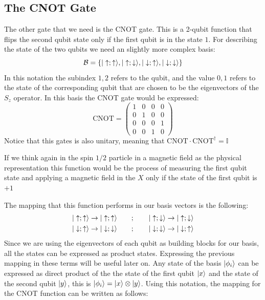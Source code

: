 \subsection{The CNOT Gate}
The other gate that we need is the CNOT gate. This is a 2-qubit function that flips the second qubit state only if the first qubit is in the state $1$. For describing the state of the two qubits we need an slightly more complex basis:
\begin{equation}
  \mathcal{B}=
  \left\{|\uparrow;\uparrow\rangle,|\uparrow;\downarrow\rangle,|\downarrow;\uparrow\rangle,|\downarrow;\downarrow\rangle\right\}
\end{equation}
 In this notation the subindex $1,2$ refers to the qubit, and the value $0,1$ refers to the state of the corresponding qubit that are chosen to be the eigenvectors of the $S_z$ operator.
In this basis the CNOT gate would be expressed:
\begin{equation}
  \text{CNOT}=\left(\begin{array}{cc|cc}
  1 & 0 & 0 & 0 \\
  0 & 1 & 0 & 0 \\\hline
  0 & 0 & 0 & 1 \\
  0 & 0 & 1 & 0
  \end{array}\right)
\end{equation}
Notice that this gates %
is also unitary, meaning that $\text{CNOT}\cdot\text{CNOT}^{\dagger}=\mathbb{I}$


If we think again in the spin $1/2$ particle in a magnetic field as the physical representation this function would be the process of measuring the first qubit state and applying a magnetic field in the $X$ only if the state of the first qubit is $+1$

The mapping that this function performs in our basis vectors is the following:
\begin{equation}
  \begin{split}
    &|\uparrow;\uparrow\rangle\rightarrow|\uparrow;\uparrow\rangle \quad\quad;\quad\quad
    |\uparrow;\downarrow\rangle\rightarrow|\uparrow;\downarrow\rangle\\
    &|\downarrow;\uparrow\rangle\rightarrow|\downarrow;\downarrow\rangle \quad\quad;\quad\quad
    |\downarrow;\downarrow\rangle\rightarrow|\downarrow;\uparrow\rangle
  \end{split}
\end{equation}
Since we are using the eigenvectors of each qubit as building blocks for our basis, all the states can be expressed as product states. Expressing the previous mapping in these terms will be useful later on.
Any state of the basis $|\phi_i\rangle$ can be expressed as direct product of the the state of the first qubit $|x\rangle$ and the state of the second qubit $|y\rangle$, this is  $|\phi_i\rangle=|x\rangle\otimes|y\rangle$.
Using this notation, the mapping for the CNOT function can be written as follows:


